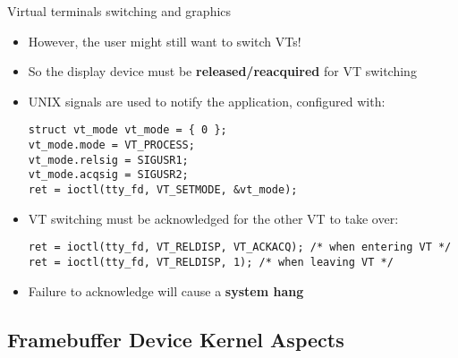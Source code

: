 \begin{frame}[fragile]{Virtual terminals switching and graphics}
  \begin{itemize}
  \item However, the user might still want to switch VTs!
  \item So the display device must be \textbf{released/reacquired} for VT switching
  \item UNIX signals are used to notify the application, configured with:
  \begin{verbatim}
struct vt_mode vt_mode = { 0 };
vt_mode.mode = VT_PROCESS;
vt_mode.relsig = SIGUSR1;
vt_mode.acqsig = SIGUSR2;
ret = ioctl(tty_fd, VT_SETMODE, &vt_mode);
  \end{verbatim}
  \item VT switching must be acknowledged for the other VT to take over:
  \begin{verbatim}
ret = ioctl(tty_fd, VT_RELDISP, VT_ACKACQ); /* when entering VT */
ret = ioctl(tty_fd, VT_RELDISP, 1); /* when leaving VT */
  \end{verbatim}
  \item Failure to acknowledge will cause a \textbf{system hang}
  \end{itemize}
\end{frame}

\subsection{Framebuffer Device Kernel Aspects}

